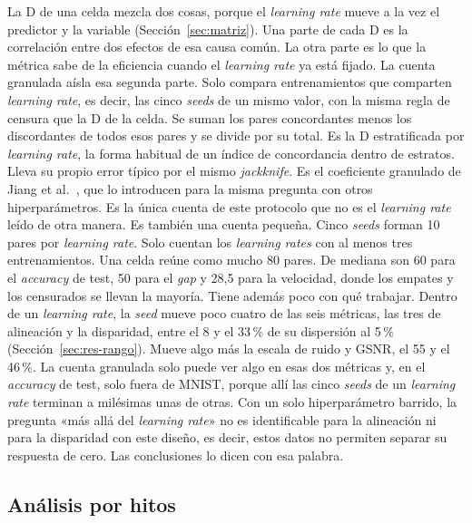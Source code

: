 La D de una celda mezcla dos cosas, porque el \emph{learning rate} mueve a la vez el predictor y la variable (Sección~\ref{sec:matriz}). Una parte de cada D es la correlación entre dos efectos de esa causa común. La otra parte es lo que la métrica sabe de la eficiencia cuando el \emph{learning rate} ya está fijado. La cuenta granulada aísla esa segunda parte. Solo compara entrenamientos que comparten \emph{learning rate}, es decir, las cinco \emph{seeds} de un mismo valor, con la misma regla de censura que la D de la celda. Se suman los pares concordantes menos los discordantes de todos esos pares y se divide por su total. Es la D estratificada por \emph{learning rate}, la forma habitual de un índice de concordancia dentro de estratos. Lleva su propio error típico por el mismo \emph{jackknife}. Es el coeficiente granulado de Jiang et al.~\cite{jiang2020fantastic}, que lo introducen para la misma pregunta con otros hiperparámetros. Es la única cuenta de este protocolo que no es el \emph{learning rate} leído de otra manera. Es también una cuenta pequeña. Cinco \emph{seeds} forman 10 pares por \emph{learning rate}. Solo cuentan los \emph{learning rates} con al menos tres entrenamientos. Una celda reúne como mucho 80 pares. De mediana son 60 para el \emph{accuracy} de test, 50 para el \emph{gap} y 28,5 para la velocidad, donde los empates y los censurados se llevan la mayoría. Tiene además poco con qué trabajar. Dentro de un \emph{learning rate}, la \emph{seed} mueve poco cuatro de las seis métricas, las tres de alineación y la disparidad, entre el 8 y el 33\,\% de su dispersión al 5\,\% (Sección~\ref{sec:res-rango}). Mueve algo más la escala de ruido y GSNR, el 55 y el 46\,\%. La cuenta granulada solo puede ver algo en esas dos métricas y, en el \emph{accuracy} de test, solo fuera de MNIST, porque allí las cinco \emph{seeds} de un \emph{learning rate} terminan a milésimas unas de otras. Con un solo hiperparámetro barrido, la pregunta «más allá del \emph{learning rate}» no es identificable para la alineación ni para la disparidad con este diseño, es decir, estos datos no permiten separar su respuesta de cero. Las conclusiones lo dicen con esa palabra.

\subsection{Análisis por hitos}
\label{sec:protocolo-hitos}

